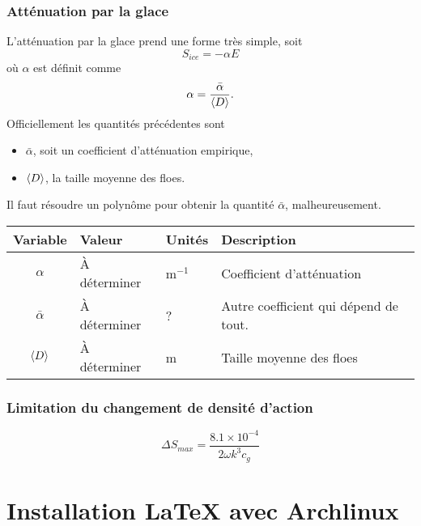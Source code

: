 \documentclass[10pt]{article}
\numberwithin{equation}{section}
\begin{document}
\subsubsection{Atténuation par la glace}
\label{sec:org3a57f89}

L'atténuation par la glace prend une forme très simple, soit
\begin{equation}
   S_{ice} = -\alpha E
\end{equation}
où \(\alpha\) est définit comme
\begin{equation}
   \alpha = \frac{\bar{\alpha}}{\expval{D}}.
\end{equation}
Officiellement les quantités précédentes sont
\begin{itemize}
\item \(\bar{\alpha}\), soit un coefficient d'atténuation empirique,
\item \(\expval{D}\), la taille moyenne des floes.
\end{itemize}
Il faut résoudre un polynôme pour obtenir la quantité \(\bar{\alpha}\), malheureusement.

\begin{center}
\begin{tabular}{clll}
Variable & Valeur & Unités & Description\\
\hline
\(\alpha\) & À déterminer & \(\mathrm{m}^{-1}\) & Coefficient d'atténuation\\
\(\bar{\alpha}\) & À déterminer & ? & Autre coefficient qui dépend de tout.\\
\(\expval{D}\) & À déterminer & m & Taille moyenne des floes\\
\end{tabular}
\end{center}
\subsubsection{Limitation du changement de densité d'action}
\label{sec:org5731ecf}

\begin{equation}
   \Delta S_{max} = \frac{8.1\times10^{-4}}{2\omega k^3 c_g}
\end{equation}
\section{Installation \LaTeX{} avec Archlinux}
\label{sec:orgdd18d34}
\end{document}
